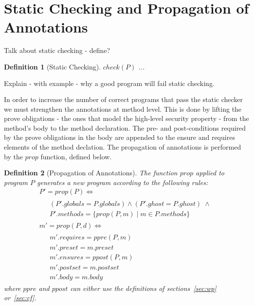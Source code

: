 \documentclass[10pt,notitlepage,twoside]{article}
\newcommand{\ppre}{\mathit{ppre}}
\newcommand{\ppost}{\mathit{ppost}}
\newtheorem{definition}{Definition}
\begin{document}
\section{Static Checking and Propagation of Annotations}

Talk about static checking - define?

\begin{definition}[Static Checking]
$\mathit{check}(P)$ ...
\end{definition}

Explain - with example - why a good program will fail static checking.

In order to increase the number of correct programs that pass the static checker we must strengthen the annotations at method level. This is done by lifting the prove obligations - the ones that model the high-level security property - from the method's body to the method declaration. The pre- and post-conditions required by the prove obligations in the body are appended to the ensure and requires elements of the method declation.
The propagation of annotations is performed  by the $\mathit{prop}$ function, defined below.


\begin{definition}[Propagation of Annotations]
The function $\mathit{prop}$ applied to program $P$ generates a new program  according to the following rules:
\begin{displaymath}
\begin{array}{l}
P' = \mathit{prop}(P) \Leftrightarrow \\
\;\;\;\;
\begin{array}{l}
(P'.\mathit{globals} = P.\mathit{globals}) \wedge (P'.\mathit{ghost} = P.\mathit{ghost}) \;\wedge \\
P'.\mathit{methods} = \{ \mathit{prop}(P,m) \mid m \in P.\mathit{methods}  \}
\end{array} \\
m' = \mathit{prop}(P,d)  \Leftrightarrow \\
\;\;\;\;
\begin{array}{l}
m'.\mathit{requires} = \ppre(P,m)  \\
m'.\mathit{preset} = m.\mathit{preset} \\
m'.\mathit{ensures} = \ppost(P,m)  \\
m'.\mathit{postset} = m.\mathit{postset} \\
m'.\mathit{body} = m.\mathit{body}
\end{array}
\end{array}
\end{displaymath}
where $\ppre$ and $\ppost$ can either use the definitions of sections~\ref{sec:wp} or~\ref{sec:cf}. 
\end{definition}
\end{document}
